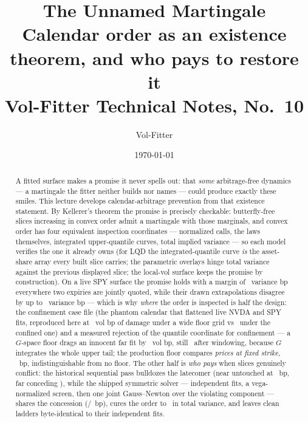 \documentclass[11pt]{article}
\title{\textbf{The Unnamed Martingale}\\[2pt]
\large Calendar order as an existence theorem, and who pays to
restore it\\[2pt]
\normalsize Vol-Fitter Technical Notes, No.~10}
\author{Vol-Fitter}
\date{\today}
\begin{document}
\maketitle



\begin{abstract}
A fitted surface makes a promise it never spells out: that \emph{some}
arbitrage-free dynamics --- a martingale the fitter neither builds nor
names --- could produce exactly these smiles.  This lecture develops
calendar-arbitrage prevention from that existence statement.  By
Kellerer's theorem the promise is precisely checkable: butterfly-free
slices increasing in convex order admit a martingale with those
marginals, and convex order has four equivalent inspection coordinates
--- normalized calls, the laws themselves, integrated upper-quantile
curves, total implied variance --- so each model verifies the one it
already owns (for LQD the integrated-quantile curve \emph{is} the
asset-share array every built slice carries; the parametric overlays
hinge total variance against the previous displayed slice; the local-vol
surface keeps the promise by construction).  On a live SPY surface the
promise holds with a margin of \calmheromarginbp\ variance bp everywhere
two expiries are jointly quoted, while their drawn extrapolations
disagree by up to \calmherophantombp\ variance bp --- which is why
\emph{where} the order is inspected is half the design: the confinement
case file (the phantom calendar that flattened live NVDA and SPY fits,
reproduced here at \calmphantomwidebp\ vol bp of damage under a wide
floor grid vs \calmphantomdatabp\ under the confined one) and a measured
rejection of the quantile coordinate for confinement --- a $G$-space
floor drags an innocent far fit by \calmdragfullbp\ vol bp, still
\calmdragwinbp\ after windowing, because $G$ integrates the whole upper
tail; the production floor compares \emph{prices at fixed strike},
\calmdragpricebp\ bp, indistinguishable from no floor.  The other half
is \emph{who pays} when slices genuinely conflict: the historical
sequential pass bulldozes the latecomer (near untouched at
\calmseqnearbp\ bp, far conceding \calmseqfarbp), while the shipped
symmetric solver --- independent fits, a vega-normalized screen, then
one joint Gauss--Newton over the violating component --- shares the
concession (\calmsymnearbp/\calmsymfarbp\ bp), cures the order to
\calmviolcured\ in total variance, and leaves clean ladders
byte-identical to their independent fits.
\end{abstract}
\end{document}
